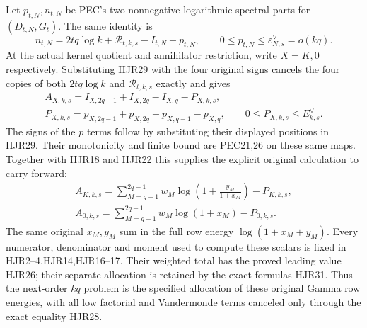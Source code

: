 \documentclass[11pt,a4paper]{article}
\begin{document}
Let $p_{t,N},n_{t,N}$ be PEC's two nonnegative logarithmic
spectral parts for $(D_{t,N},G_t)$. The same identity is
\[
 n_{t,N}
   =2tq\log k+\mathscr R_{t,k,s}-I_{t,N}+p_{t,N},
 \qquad 0\le p_{t,N}\le\varepsilon_{N,s}^{\vee}=o(kq).
 \tag{HJR29}
\]
At the actual kernel quotient and annihilator restriction,
write $X=K,0$ respectively. Substituting HJR29 with the
four original signs cancels the four copies of both
$2tq\log k$ and $\mathscr R_{t,k,s}$ exactly and gives
\[
 \begin{gathered}
 A_{X,k,s}
       =I_{X,2q-1}+I_{X,2q}-I_{X,q}-P_{X,k,s},\\
 P_{X,k,s}=p_{X,2q-1}+p_{X,2q}-p_{X,q-1}-p_{X,q},\qquad
 0\le P_{X,k,s}\le E_{k,s}^{\vee}.
 \end{gathered}\tag{HJR30}
\]
The signs of the $p$ terms follow by substituting their
displayed positions in HJR29. Their monotonicity and
finite bound are PEC21,26 on these same maps.
Together with HJR18 and HJR22 this supplies the explicit
original calculation to carry forward:
\[
 \begin{gathered}
 A_{K,k,s}
   =\sum_{M=q-1}^{2q-1}w_M
          \log\left(1+\frac{y_M}{1+x_M}\right)-P_{K,k,s},\\
 A_{0,k,s}
   =\sum_{M=q-1}^{2q-1}w_M\log(1+x_M)-P_{0,k,s}.
 \end{gathered}\tag{HJR31}
\]
The same original $x_M,y_M$ sum in the full row energy
$\log(1+x_M+y_M)$. Every numerator, denominator and
moment used to compute these scalars is fixed in
HJR2--4,HJR14,HJR16--17. Their weighted total has the
proved leading value HJR26; their separate allocation is
retained by the exact formulas HJR31.
Thus the next-order $kq$ problem is the specified allocation
of these original Gamma row energies, with all low
factorial and Vandermonde terms canceled only through
the exact equality HJR28.
\end{document}
